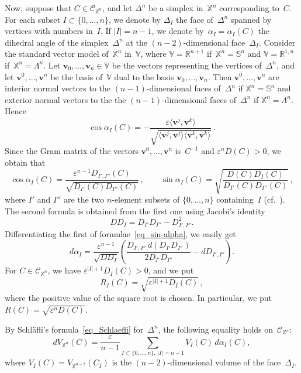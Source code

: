 \documentclass[reqno,tbtags,12pt]{amsart}
\numberwithin{equation}{section}
\newcommand{\R}{\mathbb{R}}
\newcommand{\CC}{\mathcal{C}}
\newcommand{\X}{\mathbb{X}}
\newcommand{\V}{\mathbb{V}}
\newcommand{\bS}{\mathbb{S}}
\newcommand{\bv}{\mathbf{v}}
\theoremstyle{definition}
\begin{document}
Now, suppose that $C\in\CC_{\X^n}$, and let $\Delta^n$ be a simplex in~$\X^n$ corresponding to~$C$. For each subset $I\subset\{0,\ldots,n\}$, we denote by $\Delta_I$ the face of~$\Delta^n$ spanned by vertices with numbers in~$I$. If $|I|=n-1$, we denote by~$\alpha_I=\alpha_I(C)$ the dihedral angle of the simplex~$\Delta^n$ at the $(n-2)$-dimensional face~$\Delta_I$.  Consider the standard vector model of~$\X^n$ in~$\V$, where $\V=\R^{n+1}$ if~$\X^n=\bS^n$ and $\V=\R^{1,n}$ if~$\X^n=\Lambda^n$. Let $\bv_0,\ldots,\bv_n\in\V$ be the vectors representing the vertices of~$\Delta^n$, and let $\bv^0,\ldots,\bv^n$ be the basis of~$\V$ dual to the basis $\bv_0,\ldots,\bv_n$. Then $\bv^0,\ldots,\bv^n$ are interior normal vectors to the $(n-1)$-dimensional faces of~$\Delta^n$ if $\X^n=\bS^n$ and exterior normal vectors to the the $(n-1)$-dimensional faces of~$\Delta^n$ if $\X^n=\Lambda^n$. Hence
$$
\cos\alpha_I(C)=-\frac{\varepsilon\langle\bv^j,\bv^k\rangle}
{\sqrt{\langle\bv^j,\bv^j\rangle\langle\bv^k,\bv^k\rangle}}\,.
$$
 Since the Gram matrix of the vectors $\bv^0,\ldots,\bv^n$ is~$C^{-1}$ and $\varepsilon^nD(C)>0$, we  obtain that 
\begin{equation}\label{eq_sin-alpha}
\cos\alpha_I(C)=\frac{\varepsilon^{n-1}D_{I',I''}(C)}{\sqrt{D_{I'}(C)D_{I''}(C)}}\,,\qquad
\sin\alpha_I(C)=\sqrt{\frac{D(C)D_I(C)}{D_{I'}(C)D_{I''}(C)}}\,,
\end{equation}
where $I'$ and $I''$ are the two $n$-element subsets of $\{0,\ldots,n\}$ containing~$I$ (cf.~\cite[(3.10)]{Aom77}). The second formula is obtained from the first one using Jacobi's identity
\begin{equation}\label{eq_Jac}
DD_I=D_{I'}D_{I''}-D_{I',I''}^2.
\end{equation}
Differentiating the first of formulae~\eqref{eq_sin-alpha}, we easily get
\begin{equation}\label{eq_d_alpha}
d\alpha_I=\frac{\varepsilon^{n-1}}{\sqrt{DD_I}}\left(
\frac{D_{I',I''}\,d(D_{I'}D_{I''})}{2D_{I'}D_{I''}}-dD_{I',I''}\right).
\end{equation}
For $C\in\CC_{\X^n}$, we have $\varepsilon^{|I|+1}D_I(C)>0$, and we put 
$$
R_I(C)=\sqrt{\varepsilon^{|I|+1}D_I(C)}\,,
$$
where the positive value of the square root is chosen. In particular, we put $R(C)=\sqrt{\varepsilon^{n}D(C)}$.

By Schl\"afli's formula~\eqref{eq_Schlaefli} for~$\Delta^n$, the following equality holds on~$\CC_{\X^n}$:
\begin{equation}\label{eq_Sch_simp}
d V_{\X^n}(C)=\frac{\varepsilon}{n-1}\sum_{I\subset\{0,\ldots,n\},\,|I|=n-1}V_{I}(C)\,d\alpha_I(C),
\end{equation}
where $V_I(C)=V_{\X^{n-2}}(C_I)$ is the $(n-2)$-dimensional volume of the face~$\Delta_I$. 
\end{document}
